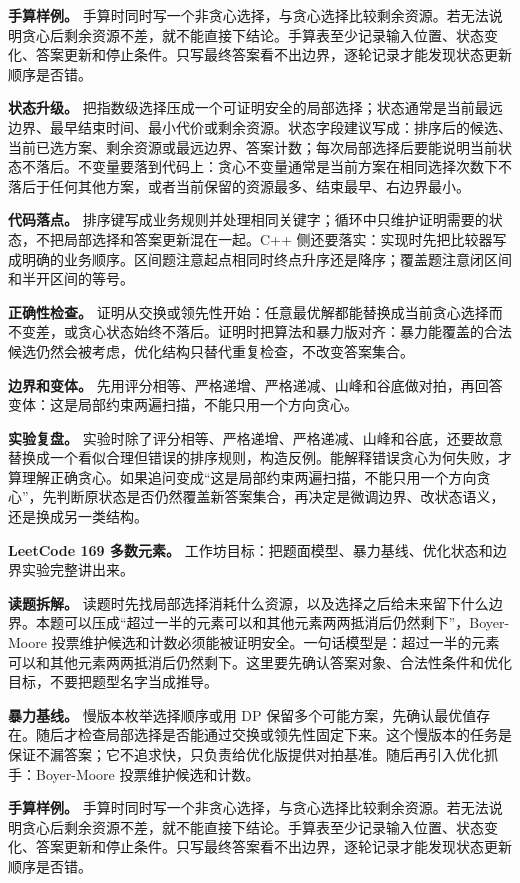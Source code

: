 \textbf{手算样例。} 手算时同时写一个非贪心选择，与贪心选择比较剩余资源。若无法说明贪心后剩余资源不差，就不能直接下结论。手算表至少记录输入位置、状态变化、答案更新和停止条件。只写最终答案看不出边界，逐轮记录才能发现状态更新顺序是否错。

\textbf{状态升级。} 把指数级选择压成一个可证明安全的局部选择；状态通常是当前最远边界、最早结束时间、最小代价或剩余资源。状态字段建议写成：排序后的候选、当前已选方案、剩余资源或最远边界、答案计数；每次局部选择后要能说明当前状态不落后。不变量要落到代码上：贪心不变量通常是当前方案在相同选择次数下不落后于任何其他方案，或者当前保留的资源最多、结束最早、右边界最小。

\textbf{代码落点。} 排序键写成业务规则并处理相同关键字；循环中只维护证明需要的状态，不把局部选择和答案更新混在一起。C++ 侧还要落实：实现时先把比较器写成明确的业务顺序。区间题注意起点相同时终点升序还是降序；覆盖题注意闭区间和半开区间的等号。

\textbf{正确性检查。} 证明从交换或领先性开始：任意最优解都能替换成当前贪心选择而不变差，或贪心状态始终不落后。证明时把算法和暴力版对齐：暴力能覆盖的合法候选仍然会被考虑，优化结构只替代重复检查，不改变答案集合。

\textbf{边界和变体。} 先用评分相等、严格递增、严格递减、山峰和谷底做对拍，再回答变体：这是局部约束两遍扫描，不能只用一个方向贪心。

\textbf{实验复盘。} 实验时除了评分相等、严格递增、严格递减、山峰和谷底，还要故意替换成一个看似合理但错误的排序规则，构造反例。能解释错误贪心为何失败，才算理解正确贪心。如果追问变成“这是局部约束两遍扫描，不能只用一个方向贪心”，先判断原状态是否仍然覆盖新答案集合，再决定是微调边界、改状态语义，还是换成另一类结构。

\noindent\textbf{LeetCode 169 多数元素。} 工作坊目标：把题面模型、暴力基线、优化状态和边界实验完整讲出来。

\textbf{读题拆解。} 读题时先找局部选择消耗什么资源，以及选择之后给未来留下什么边界。本题可以压成“超过一半的元素可以和其他元素两两抵消后仍然剩下”，Boyer-Moore 投票维护候选和计数必须能被证明安全。一句话模型是：超过一半的元素可以和其他元素两两抵消后仍然剩下。这里要先确认答案对象、合法性条件和优化目标，不要把题型名字当成推导。

\textbf{暴力基线。} 慢版本枚举选择顺序或用 DP 保留多个可能方案，先确认最优值存在。随后才检查局部选择是否能通过交换或领先性固定下来。这个慢版本的任务是保证不漏答案；它不追求快，只负责给优化版提供对拍基准。随后再引入优化抓手：Boyer-Moore 投票维护候选和计数。

\textbf{手算样例。} 手算时同时写一个非贪心选择，与贪心选择比较剩余资源。若无法说明贪心后剩余资源不差，就不能直接下结论。手算表至少记录输入位置、状态变化、答案更新和停止条件。只写最终答案看不出边界，逐轮记录才能发现状态更新顺序是否错。


